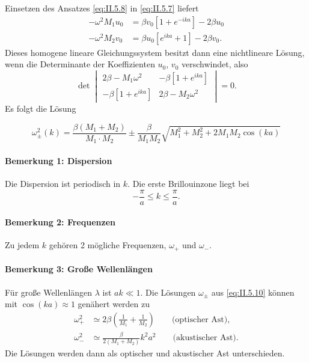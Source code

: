 	Einsetzen des Ansatzes \eqref{eq:II.5.8} in \eqref{eq:II.5.7} liefert
	\begin{equation}
		\label{eq:II.5.9}
		\begin{split}
			- \omega^2 M_1 u_0 &=  \beta v_0 \left[ 1 + e^{-ika} \right] - 2 \beta u_0 \\
			- \omega^2 M_2 v_0 &= \beta u_0 \left[ e^{ika} + 1 \right] - 2\beta v_0 .
		\end{split}
	\end{equation}
	Dieses homogene lineare Gleichungssystem besitzt dann eine nichtlineare Lösung, wenn die Determinante der Koeffizienten $u_0$, $v_0$ verschwindet, also
	$$
	\det
	\begin{vmatrix}
		2 \beta - M_1 \omega^2 & - \beta \left[ 1 + e^{ika} \right] \\
		-\beta \left[ 1 + e^{ika}\right] & 2 \beta - M_2 \omega^2
	\end{vmatrix} = 0.
	$$
	Es folgt die Lösung
	\begin{important}
		\begin{equation}
			\label{eq:II.5.10}
			\omega_{\pm}^2 (k) = \frac{\beta\left( M_1 + M_2 \right) }{M_1 \cdot M_2} \pm \frac{\beta }{M_1M_2} \sqrt{M_1^2 + M_2^2 + 2M_1M_2 \cos\left( ka \right) } 
		\end{equation}
	\end{important}

\paragraph{Bemerkung 1: Dispersion}
	Die Dispersion ist periodisch in $k$. Die erste Brillouinzone liegt bei
	$$
	- \frac{\pi}{a} \le k \le \frac{\pi}{a}.
	$$ 

\paragraph{Bemerkung 2: Frequenzen}
	Zu jedem $k$ gehören 2 mögliche Frequenzen, $\omega_+$ und $\omega_-$.

\paragraph{Bemerkung 3: Große Wellenlängen}
	Für große Wellenlängen $\lambda$ ist $ak \ll 1$. Die Lösungen $\omega_\pm$ aus \eqref{eq:II.5.10} können mit $\cos(ka)\approx 1$ genähert werden zu
	\begin{align}
		\label{eq:II.5.11}
		\omega_{+}^2 &\simeq 2\beta \left( \frac{1}{M_1} + \frac{1}{M_2} \right) \qquad \text{(optischer Ast)},\\
		\label{eq:II.5.12}
		\omega_{-}^2 &\simeq \frac{\beta}{2\left( M_1 + M_2 \right) } k^2 a^2 \qquad \text{(akustischer Ast)}.
	\end{align}
	Die Lösungen werden dann als optischer und akustischer Ast unterschieden.

